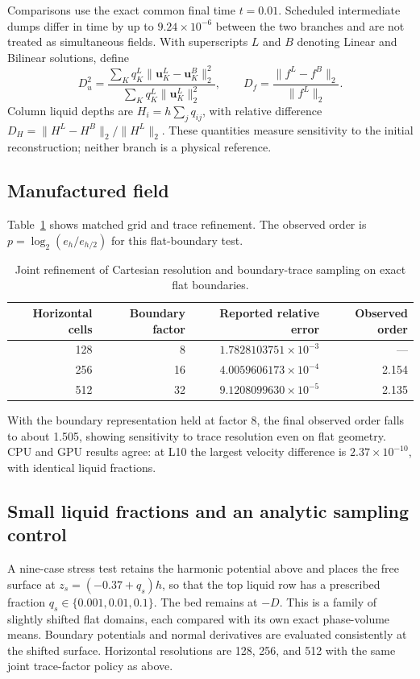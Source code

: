 \documentclass[10pt]{article}
\begin{document}
Comparisons use the exact common final time $t=0.01$. Scheduled intermediate
dumps differ in time by up to $9.24\times10^{-6}$ between the two branches
and are not treated as simultaneous fields. With superscripts $L$ and $B$
denoting Linear and Bilinear solutions, define
\begin{equation}
 D_u^2=\frac{\sum_K q_K^L\|\boldsymbol u_K^L-\boldsymbol u_K^B\|_2^2}
 {\sum_K q_K^L\|\boldsymbol u_K^L\|_2^2},\qquad
 D_f=\frac{\|f^L-f^B\|_2}{\|f^L\|_2}.
\end{equation}
Column liquid depths are $H_i=h\sum_jq_{ij}$, with relative difference
$D_H=\|H^L-H^B\|_2/\|H^L\|_2$. These quantities measure sensitivity
to the initial reconstruction; neither branch is a physical reference.

\subsection{Manufactured field}
Table~\ref{tab:manufactured} shows matched grid and trace refinement.
The observed order is $p=\log_2(e_h/e_{h/2})$ for this flat-boundary test.

\begin{table}[htbp]\centering
\caption{Joint refinement of Cartesian resolution and boundary-trace sampling
on exact flat boundaries.}
\label{tab:manufactured}
\begin{tabular}{rrrr}\toprule
Horizontal cells & Boundary factor & Reported relative error & Observed order\\
\midrule
128 & 8 & $1.7828103751\times10^{-3}$ & ---\\
256 & 16 & $4.0059606173\times10^{-4}$ & 2.154\\
512 & 32 & $9.1208099630\times10^{-5}$ & 2.135\\
\bottomrule\end{tabular}
\end{table}

With the boundary representation held at factor 8, the final observed
order falls to about 1.505, showing sensitivity to trace resolution even
on flat geometry. CPU and GPU results agree: at L10 the largest velocity
difference is $2.37\times10^{-10}$, with identical liquid fractions.

\subsection{Small liquid fractions and an analytic sampling control}
A nine-case stress test retains the harmonic potential above and places
the free surface at $z_s=(-0.37+q_s)h$, so that the top liquid row has a
prescribed fraction $q_s\in\{0.001,0.01,0.1\}$. The bed remains at $-D$.
This is a family of slightly shifted flat domains, each compared with its own
exact phase-volume means. Boundary potentials and normal derivatives are
evaluated consistently at the shifted surface. Horizontal resolutions are
128, 256, and 512 with the same joint trace-factor policy as above.
\end{document}
